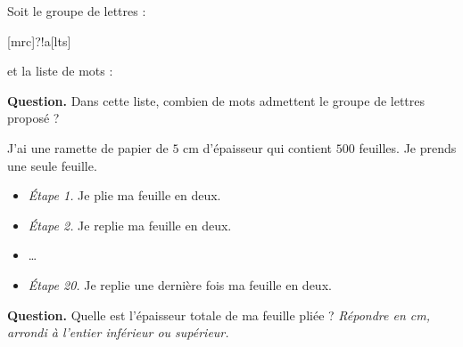 \documentclass[class=report,crop=false, 12pt]{standalone}
\begin{document}
\begin{enigme}

Soit le groupe de lettres :

\centerline{[mrc]?!a[lts]}

et la liste de mots :

\centerline{\qquad{}\qquad{}\qquad{}\qquad{}}

\centerline{\qquad{}\qquad{}\qquad{}\qquad{}}
 
 \centerline{\qquad{}\qquad{}\qquad{}\qquad{}}
 
\bigskip

\textbf{Question.} Dans cette liste, combien de mots admettent le groupe de lettres proposé ?


\end{enigme}


\begin{enigme}[Puissances de 2]

J'ai une ramette de papier de $5$ cm d'épaisseur qui contient $500$ feuilles.
Je prends une seule feuille.

\begin{itemize}
  \item \emph{Étape 1.} Je plie ma feuille en deux.
  \item \emph{Étape 2.} Je replie ma feuille en deux.
  \item \ldots
  \item \emph{Étape 20.} Je replie une dernière fois ma feuille en deux.
\end{itemize}
    
\bigskip

\textbf{Question.} Quelle est l'épaisseur totale de ma feuille pliée ?
\emph{Répondre en cm, arrondi à l'entier inférieur ou supérieur.}



\end{enigme}
\end{document}
